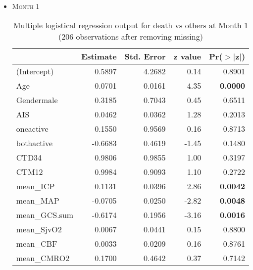 \documentclass{article}
\begin{document}
\begin{itemize}
\item \textsc{Month 1}
\begin{table}[H]
\centering
\caption{Multiple logistical regression output for death vs others at Month 1 (206 observations after removing missing)}
\begin{tabular}{lrrrr}
  \hline
 & Estimate & Std. Error & z value & Pr($>$$|$z$|$) \\ 
  \hline
(Intercept) & 0.5897 & 4.2682 & 0.14 & 0.8901 \\ 
  Age & 0.0701 & 0.0161 & 4.35 & {\bf 0.0000} \\ 
  Gendermale & 0.3185 & 0.7043 & 0.45 & 0.6511 \\ 
  AIS & 0.0462 & 0.0362 & 1.28 & 0.2013 \\ 
  oneactive & 0.1550 & 0.9569 & 0.16 & 0.8713 \\ 
  bothactive & -0.6683 & 0.4619 & -1.45 & 0.1480 \\ 
  CTD34 & 0.9806 & 0.9855 & 1.00 & 0.3197 \\ 
  CTM12 & 0.9984 & 0.9093 & 1.10 & 0.2722 \\ 
  mean\_ICP & 0.1131 & 0.0396 & 2.86 & {\bf 0.0042} \\ 
  mean\_MAP & -0.0705 & 0.0250 & -2.82 & {\bf 0.0048} \\ 
  mean\_GCS.sum & -0.6174 & 0.1956 & -3.16 & {\bf 0.0016} \\ 
  mean\_SjvO2 & 0.0067 & 0.0441 & 0.15 & 0.8800 \\ 
  mean\_CBF & 0.0033 & 0.0209 & 0.16 & 0.8761 \\ 
  mean\_CMRO2 & 0.1700 & 0.4642 & 0.37 & 0.7142 \\ 
   \hline
\end{tabular}
\end{table}



\end{itemize}
\end{document}
